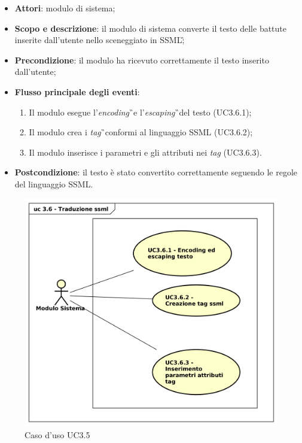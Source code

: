 \begin{itemize}
\item \textbf{Attori}: modulo di sistema;
\item \textbf{Scopo e descrizione}: il modulo di sistema converte il testo delle battute inserite dall'utente nello sceneggiato in SSML\G;
\item \textbf{Precondizione}: il modulo ha ricevuto correttamente il testo inserito dall'utente;
\item \textbf{Flusso principale degli eventi}:
\begin{enumerate}
\item Il modulo esegue l'\textit{encoding}\G\ e l'\textit{escaping}\G\ del testo (UC3.6.1);
\item Il modulo crea i \textit{tag}\G\ conformi al linguaggio SSML (UC3.6.2);
\item Il modulo inserisce i parametri e gli attributi nei \textit{tag} (UC3.6.3).
\end{enumerate}
\item \textbf{Postcondizione}: il testo è stato convertito correttamente seguendo le regole del linguaggio SSML.
\end{itemize}
\begin{figure}[htbp]
\centering
\includegraphics[scale=0.5]{immagini/uc3_6_traduzione_ssml.png}
\captionsetup{labelfont=bf}
\caption{Caso d'uso UC3.5}
\end{figure}
\newpage